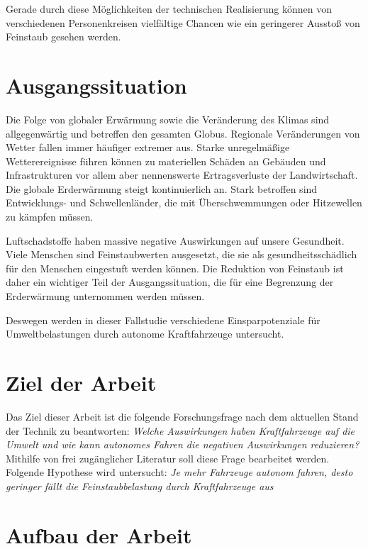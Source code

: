 Gerade durch diese Möglichkeiten der technischen Realisierung können von verschiedenen Personenkreisen
vielfältige Chancen wie ein geringerer Ausstoß von Feinstaub gesehen werden.

\section{Ausgangssituation}
Die Folge von globaler Erwärmung sowie die Veränderung des Klimas sind allgegenwärtig und betreffen den gesamten Globus.
Regionale Veränderungen von Wetter fallen immer häufiger extremer aus.
Starke unregelmäßige Wetterereignisse führen können zu materiellen Schäden an Gebäuden und Infrastrukturen vor allem aber nennenswerte Ertragsverluste der Landwirtschaft.
Die globale Erderwärmung steigt kontinuierlich an.
Stark betroffen sind Entwicklungs- und Schwellenländer, die mit Überschwemmungen oder Hitzewellen zu kämpfen müssen.


Luftschadstoffe haben massive negative Auswirkungen auf unsere Gesundheit.
Viele Menschen sind Feinstaubwerten ausgesetzt, die sie als gesundheitsschädlich für den Menschen eingestuft werden können.
Die Reduktion von Feinstaub ist daher ein wichtiger Teil der Ausgangssituation, die für eine Begrenzung der Erderwärmung unternommen werden müssen.

Deswegen werden in dieser Fallstudie verschiedene Einsparpotenziale für Umweltbelastungen durch autonome Kraftfahrzeuge untersucht.


\section{Ziel der Arbeit}
Das Ziel dieser Arbeit ist die folgende Forschungsfrage nach dem aktuellen Stand der Technik zu beantworten:
\textit{Welche Auswirkungen haben Kraftfahrzeuge auf die Umwelt und wie kann autonomes Fahren die negativen Auswirkungen reduzieren?}
Mithilfe von frei zugänglicher Literatur soll diese Frage bearbeitet werden.
Folgende Hypothese wird untersucht:
\textit{Je mehr Fahrzeuge autonom fahren, desto geringer fällt die Feinstaubbelastung durch Kraftfahrzeuge aus}

\section{Aufbau der Arbeit}



